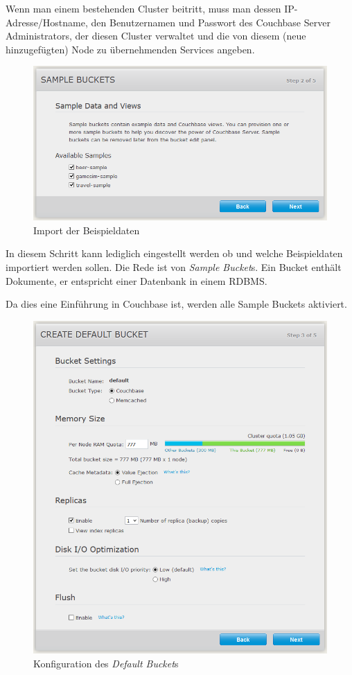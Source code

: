 Wenn man einem bestehenden Cluster beitritt, muss man dessen IP-Adresse/Hostname, den Benutzernamen und Passwort des Couchbase Server Administrators, der diesen Cluster verwaltet und die von diesem (neue hinzugefügten) Node zu übernehmenden Services angeben. \cite{couchbase-init-config}

\begin{figure}[!h]
	\begin{center}
		\includegraphics[width=0.7\linewidth]{images/init-config-2.png}
		\caption{Import der Beispieldaten} 
	\end{center}
\end{figure}

In diesem Schritt kann lediglich eingestellt werden ob und welche Beispieldaten importiert werden sollen. Die Rede ist von \textit{Sample Bucket}s. Ein Bucket enthält Dokumente, er entspricht einer Datenbank in einem RDBMS.

Da dies eine Einführung in Couchbase ist, werden alle Sample Buckets aktiviert.
\pagebreak

\begin{figure}[!h]
	\begin{center}
		\includegraphics[width=0.7\linewidth]{images/init-config-3.png}
		\caption{Konfiguration des \textit{Default Bucket}s}
	\end{center}
\end{figure}

